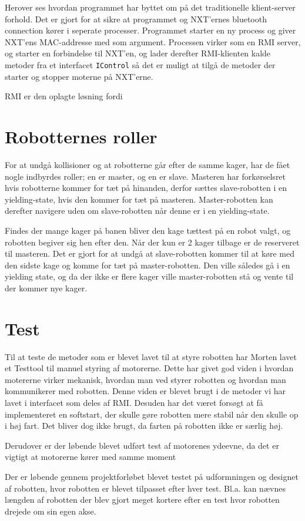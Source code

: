 
Herover ses hvordan programmet har byttet om på det traditionelle klient-server forhold. Det er gjort for at sikre at programmet og NXT’ernes bluetooth connection kører i seperate processer. Programmet starter en ny process og giver NXT’ens MAC-addresse med som argument. Processen virker som en RMI server, og starter en forbindelse til NXT’en, og lader derefter RMI-klienten kalde metoder fra et interfacet \texttt{IControl} så det er muligt at tilgå de metoder der starter og stopper moterne på NXT’erne.

RMI er den oplagte løsning fordi 

\section{Robotternes roller}
For at undgå kollisioner og at robotterne går efter de samme kager, har de fået nogle indbyrdes roller; en er master, og en er slave. Masteren har forkørselsret hvis robotterne kommer for tæt på hinanden, derfor sættes slave-robotten i en yielding-state, hvis den kommer for tæt på masteren. Master-robotten kan derefter navigere uden om slave-robotten når denne er i en yielding-state.

Findes der mange kager på banen bliver den kage tættest på en robot valgt, og robotten begiver sig hen efter den. Når der kun er 2 kager tilbage er de reserveret til masteren. Det er gjort for at undgå at slave-robotten kommer til at køre med den sidste kage og komme for tæt på master-robotten. Den ville således gå i en yielding state, og da der ikke er flere kager ville master-robotten stå og vente til der kommer nye kager.

\section{Test}
Til at teste de metoder som er blevet lavet til at styre robotten har Morten lavet et Testtool til manuel styring af motorerne. Dette har givet god viden i hvordan motererne virker mekanisk, hvordan man ved styrer robotten og hvordan man kommunikerer med robotten. Denne viden er blevet brugt i de metoder vi har lavet i interfacet som deles af RMI. Desuden har det været forsøgt at få implementeret en softstart, der skulle gøre robotten mere stabil når den skulle op i høj fart. Det bliver dog ikke brugt, da farten på robotten ikke er særlig høj.

Derudover er der løbende blevet udført test af motorenes ydeevne, da det er vigtigt at motorerne kører med samme moment

Der er løbende gennem projektforløbet blevet testet på udformningen og designet af robotten, hvor robotten er blevet tilpasset efter hver test. Bl.a. kan nævnes længden af robotten der blev gjort meget kortere efter en test hvor robotten drejede om sin egen akse.